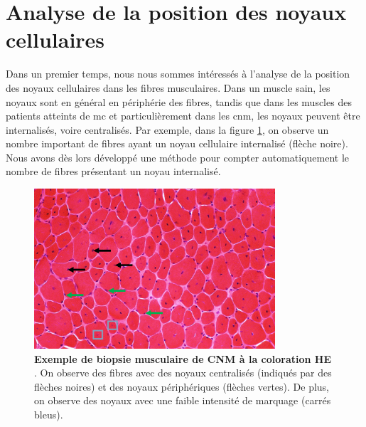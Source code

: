 \section{Analyse de la position des noyaux cellulaires}
Dans un premier temps, nous nous sommes intéressés à l'analyse de la position des noyaux cellulaires dans les fibres musculaires. Dans un muscle sain, les noyaux sont en général en périphérie des fibres, tandis que dans les muscles des patients atteints de \gls{mc} et particulièrement dans les \gls{cnm}, les noyaux peuvent être internalisés, voire centralisés. Par exemple, dans la figure \ref{fig:he_example}, on observe un nombre important de fibres ayant un noyau cellulaire internalisé (flèche noire). Nous avons dès lors développé une méthode pour compter automatiquement le nombre de fibres présentant un noyau internalisé.
\begin{figure}[!htbp]
 \centering
 \includegraphics[width=0.8\textwidth]{figures/he_example.jpg}
 \caption[Exemple de biopsie musculaire à la coloration HE]{\textbf{Exemple de biopsie musculaire de CNM à la coloration HE }. On observe des fibres avec des noyaux centralisés (indiqués par des flèches noires) et des noyaux périphériques (flèches vertes). De plus, on observe des noyaux avec une faible intensité de marquage (carrés bleus).}
 \label{fig:he_example}
\end{figure}

